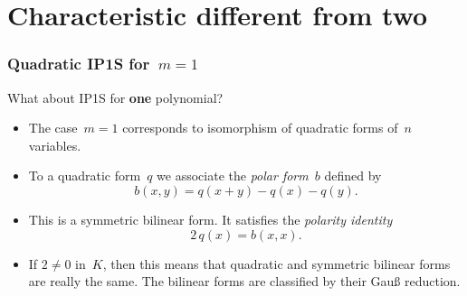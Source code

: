 \documentclass{beamer}%
\def\transpose{{}^{\mathrm{\scriptscriptstyle t}}\!}
\def\strong#1{{\bf\color{rouge}#1}}
\def\emphz#1{\emph{{\color{bleu}#1}}}
\let\mathrm\mathsf
\begin{document}
\section{Characteristic different from two}
\begin{frame}\frametitle{Quadratic IP1S for~$m = 1$}%
What about IP1S for \strong{one} polynomial?
\begin{itemize}
\item The case~$m = 1$ corresponds to isomorphism of quadratic forms of~$n$
variables.
\item To a quadratic form~$q$ we associate the \emphz{polar form}~$b$
defined by
\begin{equation*}
b(x,y) = q(x+y) - q(x) - q(y).
\end{equation*}
\item This is a symmetric bilinear form. It satisfies the \emphz{polarity
identity}
\begin{equation*}
2\,q(x) = b(x,x).
\end{equation*}
\item If $2 ≠ 0$ in~$K$, then this means that quadratic and symmetric
bilinear forms are really the same. The bilinear forms are classified by
their Gauß reduction.
\end{itemize}
\end{frame}%
\end{document}
